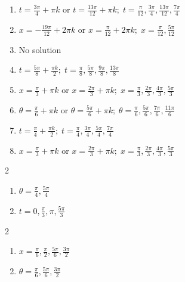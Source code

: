 \documentclass{ximera}
\begin{document}
\begin{enumerate}
\item $t = \frac{3\pi}{4} + \pi k$ or $t = \frac{13\pi}{12} + \pi k; \; t = \frac{\pi}{12}, \frac{3\pi}{4}, \frac{13\pi}{12}, \frac{7\pi}{4}$

\item $x = -\frac{19\pi}{12} + 2\pi k$ or $x = \frac{\pi}{12} + 2\pi k; \; x = \frac{\pi}{12}, \frac{5\pi}{12}$

\item No solution

\item $t = \frac{5\pi}{8} + \frac{\pi k}{2}; \; t = \frac{\pi}{8}, \frac{5\pi}{8}, \frac{9\pi}{8}, \frac{13\pi}{8}$

\item $x = \frac{\pi}{3} + \pi k$ or $x = \frac{2\pi}{3} + \pi k; \; x = \frac{\pi}{3}, \frac{2\pi}{3}, \frac{4\pi}{3}, \frac{5\pi}{3}$

\item $\theta  = \frac{\pi}{6} + \pi k$ or $\theta = \frac{5\pi}{6} + \pi k; \; \theta = \frac{\pi}{6}, \frac{5\pi}{6}, \frac{7\pi}{6}, \frac{11\pi}{6}$

\item $t = \frac{\pi}{4} + \frac{\pi k}{2}; \; t = \frac{\pi}{4}, \frac{3\pi}{4}, \frac{5\pi}{4}, \frac{7\pi}{4}$

\item $x = \frac{\pi}{3} + \pi k$ or $x = \frac{2\pi}{3} + \pi k; \; x = \frac{\pi}{3}, \frac{2\pi}{3}, \frac{4\pi}{3}, \frac{5\pi}{3}$

\setcounter{HW}{\value{enumi}}

\end{enumerate}

\begin{multicols}{2}

\begin{enumerate}

\setcounter{enumi}{\value{HW}}

\item $\theta = \frac{\pi}{4}, \frac{5\pi}{4}$
\item $t = 0, \frac{\pi}{3}, \pi, \frac{5\pi}{3}$

\setcounter{HW}{\value{enumi}}

\end{enumerate}

\end{multicols}

\begin{multicols}{2}

\begin{enumerate}

\setcounter{enumi}{\value{HW}}

\item $x = \frac{\pi}{6}, \frac{\pi}{2}, \frac{5\pi}{6}, \frac{3\pi}{2}$
\item $\theta = \frac{\pi}{6}, \frac{5\pi}{6}, \frac{3\pi}{2}$

\setcounter{HW}{\value{enumi}}

\end{enumerate}

\end{multicols}
\end{document}
